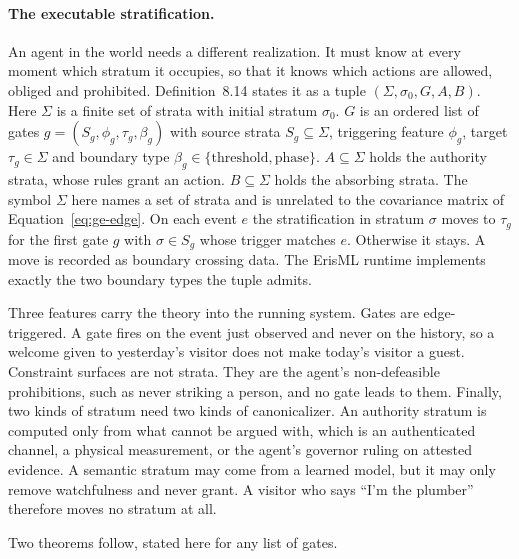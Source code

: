 \paragraph{The executable stratification.} An agent in the world needs a different realization. It
must know at every moment which stratum it occupies, so that it knows which actions are allowed,
obliged and prohibited.
Definition~8.14 states it as a tuple $(\Sigma,\sigma_0,G,A,B)$. Here $\Sigma$ is a finite set of
strata with initial stratum $\sigma_0$. $G$ is an ordered list of gates
$g=(S_g,\phi_g,\tau_g,\beta_g)$ with source strata $S_g\subseteq\Sigma$, triggering feature
$\phi_g$, target $\tau_g\in\Sigma$ and boundary type $\beta_g\in\{\text{threshold},\text{phase}\}$.
$A\subseteq\Sigma$ holds the authority strata, whose rules grant an action. $B\subseteq\Sigma$
holds the absorbing strata. The symbol $\Sigma$ here names a set of strata and is unrelated to the
covariance matrix of Equation~\eqref{eq:ge-edge}.
On each event $e$ the stratification in stratum $\sigma$ moves to $\tau_g$ for the first gate $g$
with $\sigma\in S_g$ whose trigger matches $e$. Otherwise it stays. A move is recorded as boundary
crossing data.
The ErisML runtime implements exactly the two boundary types the tuple admits.

Three features carry the theory into the running system.
Gates are edge-triggered. A gate fires on the event just observed and never on the history, so a
welcome given to yesterday's visitor does not make today's visitor a guest. Constraint surfaces are
not strata. They are the agent's non-defeasible prohibitions, such as never striking a person, and
no gate leads to them. Finally, two kinds of stratum need two kinds of canonicalizer. An
authority stratum is computed only from what cannot be argued with, which is an authenticated
channel, a physical measurement, or the agent's governor ruling on attested evidence. A semantic
stratum may come from a learned model, but it may only remove watchfulness and never grant. A
visitor who says ``I'm the plumber'' therefore moves no stratum at all.

Two theorems follow, stated here for any list of gates.

